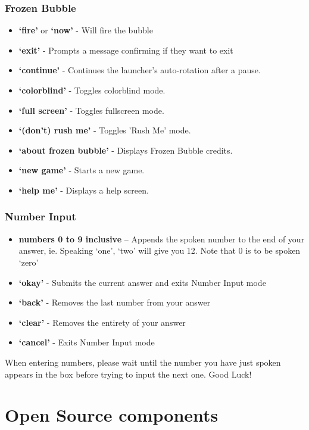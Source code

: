 \documentclass[11pt, oneside]{article}
\begin{document}
\subsubsection{Frozen Bubble}

\begin{itemize}
	\item {\bf`fire'} or {\bf`now'} - Will fire the bubble
	\item {\bf`exit'} - Prompts a message confirming if they want to exit
	\item {\bf`continue'} - Continues the launcher's auto-rotation after a pause.
	\item {\bf`colorblind'} - Toggles colorblind mode.
	\item {\bf`full screen'} - Toggles fullscreen mode.
	\item {\bf`(don't) rush me'} - Toggles 'Rush Me' mode.
	\item {\bf`about frozen bubble'} - Displays Frozen Bubble credits.
	\item {\bf`new game'} - Starts a new game.
	\item {\bf`help me'} - Displays a help screen.
	
\end{itemize}

\pagebreak

\subsubsection{Number Input}
\begin{itemize}
  \item {\bf numbers 0 to 9 inclusive} – Appends the spoken number
    to the end of your answer, ie. Speaking `one', `two' will give you
    12. Note that 0 is to be spoken `zero'
  \item {\bf `okay'} - Submits the current answer and exits Number
    Input mode
  \item {\bf `back'} - Removes the last number from your answer
  \item {\bf `clear'} - Removes the entirety of your answer
  \item {\bf `cancel'} - Exits Number Input mode
\end{itemize}

When entering numbers, please wait until the number you have just spoken appears
in the box before trying to input the next one.
Good Luck!

\section{Open Source components}
\end{document}
